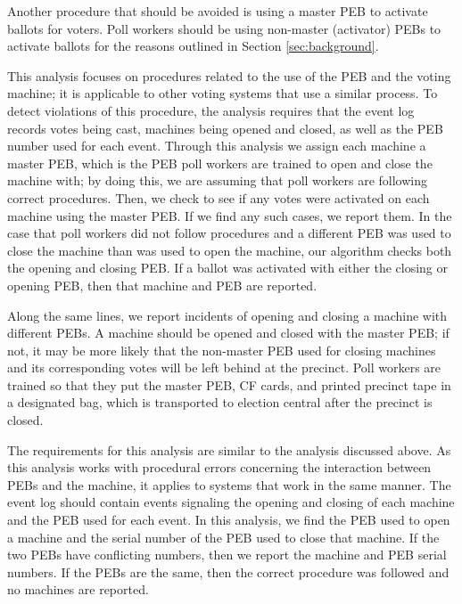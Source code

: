 Another procedure that should be avoided is using a master PEB to activate ballots for voters.  Poll workers should be using non-master (activator) PEBs to activate ballots for the reasons outlined in Section \ref{sec:background}.

This analysis focuses on procedures related to the use of the PEB and the voting machine; it is applicable to other voting systems that use a similar process.  To detect violations of this procedure, the analysis requires that the event log records votes being cast, machines being opened and closed, as well as the PEB number used for each event.  Through this analysis we assign each machine a master PEB, which is the PEB poll workers are trained to open and close the machine with; by doing this, we are assuming that poll workers are following correct procedures.  Then, we check to see if any votes were activated on each machine using the master PEB.  If we find any such cases, we report them.  In the case that poll workers did not follow procedures and a different PEB was used to close the machine than was used to open the machine, our algorithm checks both the opening and closing PEB.  If a ballot was activated with either the closing or opening PEB, then that machine and PEB are reported.  

\label{sec:opening_closing_diff_pebs}
Along the same lines, we report incidents of opening and closing a
machine with different PEBs. A machine should be opened and closed
with the master PEB; if not, it may be more likely that the non-master
PEB used for closing machines and its corresponding votes will be left behind at the precinct.  Poll workers are trained so that they put the master PEB, CF cards, and printed precinct tape in a designated bag, which is transported to election central after the precinct is closed.  

The requirements for this analysis are similar to the analysis discussed above.  As this analysis works with procedural errors concerning the interaction between PEBs and the machine, it applies to systems that work in the same manner.  The event log should contain events signaling the opening and closing of each machine and the PEB used for each event.  In this analysis, we find the PEB used to open a machine and the serial number of the PEB used to close that machine.  If the two PEBs have conflicting numbers, then we report the machine and PEB serial numbers.  If the PEBs are the same, then the correct procedure was followed and no machines are reported.  

